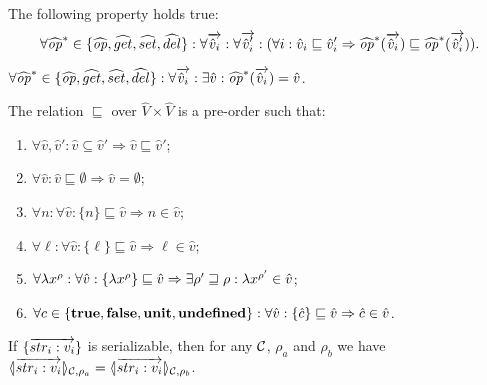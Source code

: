 \begin{assumption}
\label{asm:mono-abs}
The following property holds true:
\[
\forall \widehat{\mathit{op}}^* \in \{\widehat{\mathit{op}},\widehat{get},\widehat{set},\widehat{del}\}: \forall \overrightarrow{\hat{v}_i}: \forall \overrightarrow{\hat{v}_i'}: (\forall i: \hat{v}_i \sqsubseteq \hat{v}_i' \Rightarrow \widehat{\mathit{op}}^*(\overrightarrow{\hat{v}_i}) \sqsubseteq \widehat{\mathit{op}}^*(\overrightarrow{\hat{v}_i'})).
\]
\end{assumption}

\begin{assumption}
\label{asm:totality-abs}
$\forall \widehat{\mathit{op}}^* \in \{\widehat{\mathit{op}},\widehat{get},\widehat{set},\widehat{del}\}: \forall \overrightarrow{\hat{v}_i}: \exists \hat{v}: \widehat{\mathit{op}}^*(\overrightarrow{\hat{v}_i}) = \hat{v}$.
\end{assumption}

\begin{assumption}
\label{asm:ordering}
The relation $\sqsubseteq$ over $\hat{V} \times \hat{V}$ is a pre-order such that:
\begin{enumerate}
\item $\forall \hat{v},\hat{v}': \hat{v} \subseteq \hat{v}' \Rightarrow \hat{v} \sqsubseteq \hat{v}'$;
\item $\forall \hat{v}: \hat{v} \sqsubseteq \emptyset \Rightarrow \hat{v} = \emptyset$;
\item $\forall n: \forall \hat{v}: \{n\} \sqsubseteq \hat{v} \Rightarrow n \in \hat{v}$;
\item $\forall \ell: \forall \hat{v}: \{\ell\} \sqsubseteq \hat{v} \Rightarrow \ell \in \hat{v}$;
\item $\forall \lambda x^{\rho}: \forall \hat{v}: \{\lambda x^{\rho}\} \sqsubseteq \hat{v} \Rightarrow \exists \rho' \sqsupseteq \rho: \lambda x^{\rho'} \in \hat{v}$;
\item $\forall c \in \{\mathbf{true},\mathbf{false},\mathbf{unit},\mathbf{undefined}\}: \forall \hat{v}: \{\hat{c}\} \sqsubseteq \hat{v} \Rightarrow \hat{c} \in \hat{v}$.
\end{enumerate}
\end{assumption}

\begin{assumption}
\label{asm:serializable-rec}
If $\{\overrightarrow{str_i:v_i}\}$ is serializable, then for any ${\cal C}$, $\rho_a$ and $\rho_b$ we have $\langle\!| \overrightarrow{str_i:v_i} |\!\rangle_{{\cal C},\rho_a} = \langle\!| \overrightarrow{str_i:v_i} |\!\rangle_{{\cal C},\rho_b}$.
\end{assumption}

